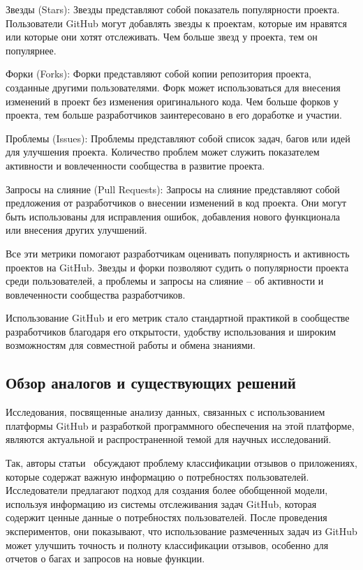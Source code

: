 \begin{itemizecustom}
    \item Звезды (Stars): Звезды представляют собой показатель популярности проекта. Пользователи GitHub могут добавлять звезды к проектам, которые им нравятся или которые они хотят отслеживать. Чем больше звезд у проекта, тем он популярнее.

    \item Форки (Forks): Форки представляют собой копии репозитория проекта, созданные другими пользователями. Форк может использоваться для внесения изменений в проект без изменения оригинального кода. Чем больше форков у проекта, тем больше разработчиков заинтересовано в его доработке и участии.

    \item Проблемы (Issues): Проблемы представляют собой список задач, багов или идей для улучшения проекта. Количество проблем может служить показателем активности и вовлеченности сообщества в развитие проекта.

    \item Запросы на слияние (Pull Requests): Запросы на слияние представляют собой предложения от разработчиков о внесении изменений в код проекта. Они могут быть использованы для исправления ошибок, добавления нового функционала или внесения других улучшений.
\end{itemizecustom}

Все эти метрики помогают разработчикам оценивать популярность и активность проектов на GitHub. Звезды и форки позволяют судить о популярности проекта среди пользователей, а проблемы и запросы на слияние -- об активности и вовлеченности сообщества разработчиков.

Использование GitHub и его метрик стало стандартной практикой в сообществе разработчиков благодаря его открытости, удобству использования и широким возможностям для совместной работы и обмена знаниями.

\subsection{Обзор аналогов и существующих решений}
\label{subsec:Analogues}

Исследования, посвященные анализу данных, связанных с использованием платформы GitHub и разработкой программного обеспечения на этой платформе, являются актуальной и распространенной темой для научных исследований.

Так, авторы статьи~\cite{abs-2308-14211} обсуждают проблему классификации отзывов о приложениях, которые содержат важную информацию о потребностях пользователей. Исследователи предлагают подход для создания более обобщенной модели, используя информацию из системы отслеживания задач GitHub, которая содержит ценные данные о потребностях пользователей. После проведения экспериментов, они показывают, что использование размеченных задач из GitHub может улучшить точность и полноту классификации отзывов, особенно для отчетов о багах и запросов на новые функции. 

